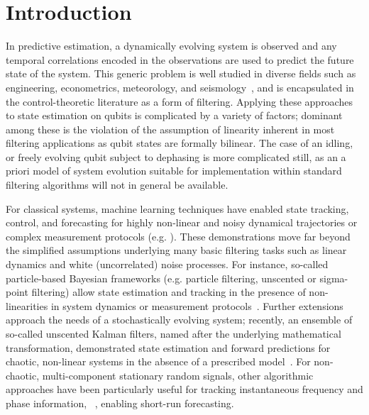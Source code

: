 \section{Introduction} 

In predictive estimation, a dynamically evolving system is observed and any temporal correlations encoded in the observations are used to predict the future state of the system.  This generic problem is well studied in diverse fields such as engineering, econometrics, meteorology, and seismology~\cite{groen2013real,dong2009unscented,ko2009gp,harvey1990forecasting,cheng2015time}, and is encapsulated in the control-theoretic literature as a form of filtering.  Applying these approaches to state estimation on qubits is complicated by a variety of factors; dominant among these is the violation of the assumption of linearity inherent in most filtering applications as qubit states are formally bilinear. The case of an idling, or freely evolving qubit subject to dephasing is more complicated still, as an a priori model of system evolution suitable for implementation within standard filtering algorithms will not in general be available.

For classical systems, machine learning techniques have enabled state tracking, control, and forecasting for highly non-linear and noisy dynamical trajectories or complex measurement protocols (e.g. \cite{garcia2016optimal, bach2004learning, tatinati2013hybrid, hall2011reinforcement, hamilton2016ensemble}). These demonstrations move far beyond the simplified assumptions underlying many basic filtering tasks such as linear dynamics and white (uncorrelated) noise processes. For instance, so-called particle-based Bayesian frameworks (e.g. particle filtering, unscented or sigma-point filtering) allow state estimation and tracking in the presence of non-linearities in system dynamics or measurement protocols~\cite{candy2016bayesian}.  Further extensions approach the needs of a stochastically evolving system; recently, an ensemble of so-called unscented Kalman filters, named after the underlying mathematical transformation, demonstrated state estimation and forward predictions for chaotic, non-linear systems in the absence of a prescribed model~\cite{hamilton2016ensemble}. For non-chaotic, multi-component stationary random signals, other algorithmic approaches have been particularly useful for tracking instantaneous frequency and phase information, ~\cite{boashash1992estimating2, ji2016gradient}, enabling short-run forecasting.  

